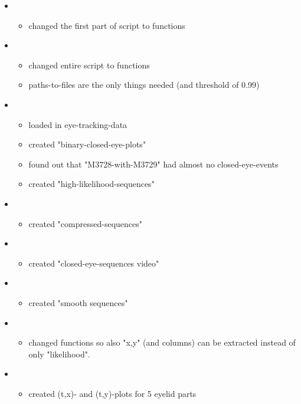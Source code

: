 \documentclass{article}
\begin{document}
\begin{itemize}
    \item \begin{itemize}
        \item changed the first part of script to functions
    \end{itemize}
    
    \item \begin{itemize}
        \item changed entire script to functions
        \item paths-to-files are the only things needed (and threshold of 0.99)
    \end{itemize}
    
    \item \begin{itemize}
        \item loaded in eye-tracking-data
        \item created "binary-closed-eye-plots"
        \item found out that "M3728-with-M3729" had almost no closed-eye-events
        \item created "high-likelihood-sequences"
    \end{itemize}
    
    \item \begin{itemize}
        \item created "compressed-sequences"
    \end{itemize}
    
    \item \begin{itemize}
        \item created "closed-eye-sequences video"
    \end{itemize}
    
    \item \begin{itemize}
        \item created "smooth sequences"
    \end{itemize}
    
    \item \begin{itemize}
        \item changed functions so also "x,y" (and columns) can be extracted instead of only "likelihood".
    \end{itemize}
    
    \item \begin{itemize}
        \item created (t,x)- and (t,y)-plots for 5 eyelid parts
    \end{itemize}
    

\end{itemize}
\end{document}
